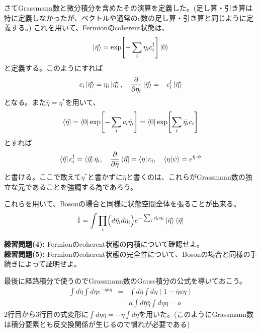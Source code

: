\documentclass[a4paper,12pt]{jsarticle}
\newcommand{\p}{\partial}
\begin{document}
さてGrassmann数と微分積分を含めたその演算を定義した。(足し算・引き算は特に定義しなかったが、ベクトルや通常のc数の足し算・引き算と同じように定義する。) これを用いて、Fermionのcoherent状態は、
\begin{eqnarray}
  \ket{\vec{\eta}} = \exp[-\sum_i\eta_i c^{\dagger}_i]\ket{0}
\end{eqnarray}
と定義する。このようにすれば
\begin{eqnarray}
  c_i \ket{\vec{\eta}} = \eta_i \ket{\vec{\eta}}, \quad \frac{\p}{\p\eta_i}\ket{\vec{\eta}} = -c^\dagger_i \ket{\vec{\eta}}
\end{eqnarray}
となる。また$\bar{\eta} = \eta^*$を用いて、
\begin{eqnarray}
  \bra{\vec{\eta}} = \bra{0}\exp[-\sum_i c_i \bar{\eta_i}] = \bra{0}\exp[\sum_i \bar{\eta_i} c_i] 
\end{eqnarray}
とすれば
\begin{eqnarray}
  \bra{\vec{\eta}}c^\dagger_i = \bra{\vec{\eta}} \bar{\eta_i}, \quad \frac{\p}{\p\bar{\eta}}\bra{\vec{\eta}} = \bra{\eta}c_i, \quad \braket{\eta}{\psi} = e^{\bar{\eta}\cdot\psi}
\end{eqnarray}
と書ける。ここで敢えて$\eta^*$と書かずに$\bar{\eta}$と書くのは、これらがGrassmann数の独立な元であることを強調する為であろう。

これらを用いて、Bosonの場合と同様に状態空間全体を張ることが出来る。
\begin{eqnarray}
  \hat{1} = \int \prod_i \Bigl(d\bar{\eta}_i d\eta_i\Bigr) e^{-\sum_i\bar{\eta_i}\eta_i}\ket{\vec{\eta}}\bra{\vec{\eta}}
\end{eqnarray}
\begin{mdframed}[linewidth=1pt]
\textbf{練習問題(4):} Fermionのcoherent状態の内積について確認せよ。\\
\textbf{練習問題(5):} Fermionのcoherent状態の完全性について、Bosonの場合と同様の手続きによって証明せよ。
\end{mdframed}

最後に経路積分で使うのでGrassmann数のGauss積分の公式を導いておこう。
\begin{eqnarray}
  \int d\bar{\eta}\int d\eta e^{-\bar{\eta}a\eta} &=& \int d\bar{\eta}\int d\eta (1 - \bar{\eta}a\eta)\nonumber\\
  &=& a\int d\bar{\eta} \bar{\eta}\int d\eta \eta = a
\end{eqnarray}
2行目から3行目の式変形に$\int d\eta \bar{\eta} = - \bar{\eta} \int d\eta$を用いた。(このようにGrassmann数は積分要素とも反交換関係が生じるので慣れが必要である)
\end{document}
